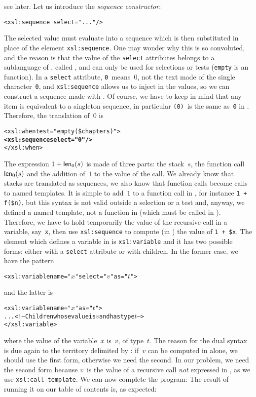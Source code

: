 see later. Let us introduce the \emph{sequence constructor}:
\begin{verbatim}
<xsl:sequence select="..."/>
\end{verbatim}
The selected value must evaluate into a sequence which is then
substituted in place of the element \texttt{xsl:sequence}. One may
wonder why this is so convoluted, and the reason is that the value of
the \texttt{select} attributes belongs to a sublanguage of \XSLT,
called \XPath, and \XPath can only be used for selections or tests
(\texttt{empty} is an \XPath function). In a \texttt{select}
attribute, \texttt{0}~means~\(0\), not the text made of the single
character~\texttt{0}, and \texttt{xsl:sequence} allows us to inject in
\XSLT the \XPath values, so we can construct a sequence made with
\XPath. Of course, we have to keep in mind that any item is equivalent
to a singleton sequence, in particular \texttt{(0)}~is the same
as~\texttt{0} in \XPath. Therefore, the translation of~\(0\) is
\begin{alltt}
      <xsl:when test="empty(\$chapters)">
        \textbf{<xsl:sequence select="0"/>}
      </xsl:when>
\end{alltt}
The expression \(1 + \textsf{len}_0(s)\) is made of three parts: the
stack~\(s\), the function call \(\textsf{len}_0(s)\) and the addition
of~\(1\) to the value of the call. We already know that stacks are
translated as sequences, we also know that function calls become calls
to named templates. It is simple to add~\(1\) to a function call in
\XPath, for instance \texttt{1 + f(\$n)}, but this syntax is not valid
outside a selection or a test and, anyway, we defined a named
template, not a function in \XSLT (which must be called in
\XPath). Therefore, we have to hold temporarily the value of the
recursive call in a variable, say~\texttt{x}, then use
\texttt{xsl:sequence} to compute (in \XPath) the value of \texttt{1 +
  \$x}. The element which defines a variable in \XSLT is
\texttt{xsl:variable} and it has two possible forms: either with a
\texttt{select} attribute or with children. In the former case, we
have the pattern
\begin{alltt}
<xsl:variable name="\(x\)" select="\(v\)" as="\(t\)">
\end{alltt}
and the latter is
\begin{alltt}
<xsl:variable name="\(x\)" as="\(t\)">
  ... <!-- Children whose value is \(v\) and has type \(t\) -->
</xsl:variable>
\end{alltt}
where the value of the variable~\(x\) is~\(v\), of type~\(t\). The
reason for the dual syntax is due again to the territory delimited by
\XPath: if~\(v\) can be computed in \XPath alone, we should use the
first form, otherwise we need the second. In our problem, we need the
second form because \(v\)~is the value of a recursive call \emph{not}
expressed in \XPath, as we use \texttt{xsl:call-template}. We can now
complete the program: 
\noindent The result of running it on our table of contents is, as
expected:

